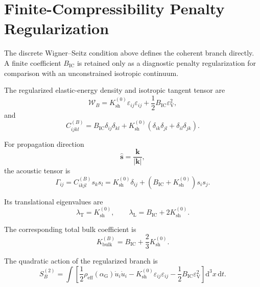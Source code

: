 \section{Finite-Compressibility Penalty Regularization}
\label{sec:AP_finite_regularization}

The discrete Wigner--Seitz condition above defines the coherent branch directly. A finite coefficient $B_{\mathrm{IC}}$ is retained only as a diagnostic penalty regularization for comparison with an unconstrained isotropic continuum.

The regularized elastic-energy density and isotropic tangent tensor are
\begin{equation}
    \mathcal{W}_{B}
    =
    K_{\mathrm{sh}}^{(0)}
    \varepsilon_{ij}\varepsilon_{ij}
    +
    \frac{1}{2}
    B_{\mathrm{IC}}
    \varepsilon_{\mathrm{V}}^2,
\end{equation}
and
\begin{equation}
    C_{ijkl}^{(B)}
    =
    B_{\mathrm{IC}}\delta_{ij}\delta_{kl}
    +
    K_{\mathrm{sh}}^{(0)}
    \left(
        \delta_{ik}\delta_{jl}
        +
        \delta_{il}\delta_{jk}
    \right).
\end{equation}

For propagation direction
\begin{equation}
    \hat{\mathbf{s}}
    =
    \frac{\mathbf{k}}{|\mathbf{k}|},
\end{equation}
the acoustic tensor is
\begin{equation}
    \Gamma_{ij}
    =
    C_{ikjl}^{(B)}
    s_ks_l
    =
    K_{\mathrm{sh}}^{(0)}
    \delta_{ij}
    +
    \left(
        B_{\mathrm{IC}}
        +
        K_{\mathrm{sh}}^{(0)}
    \right)
    s_is_j.
\end{equation}

Its translational eigenvalues are
\begin{equation}
    \lambda_{\mathrm{T}}
    =
    K_{\mathrm{sh}}^{(0)},
    \qquad
    \lambda_{\mathrm{L}}
    =
    B_{\mathrm{IC}}
    +
    2K_{\mathrm{sh}}^{(0)}.
\end{equation}

The corresponding total bulk coefficient is
\begin{equation}
    K_{\mathrm{bulk}}^{(B)}
    =
    B_{\mathrm{IC}}
    +
    \frac{2}{3}
    K_{\mathrm{sh}}^{(0)}.
\end{equation}

The quadratic action of the regularized branch is
\begin{equation}
    S_{B}^{(2)}
    =
    \int
    \left[
        \frac{1}{2}
        \rho_{\mathrm{eff}}(\alpha_{\mathrm{G}})
        \dot{u}_i\dot{u}_i
        -
        K_{\mathrm{sh}}^{(0)}
        \varepsilon_{ij}\varepsilon_{ij}
        -
        \frac{1}{2}
        B_{\mathrm{IC}}
        \varepsilon_{\mathrm{V}}^2
    \right]
    \mathrm{d}^3x\,\mathrm{d}t.
\end{equation}


